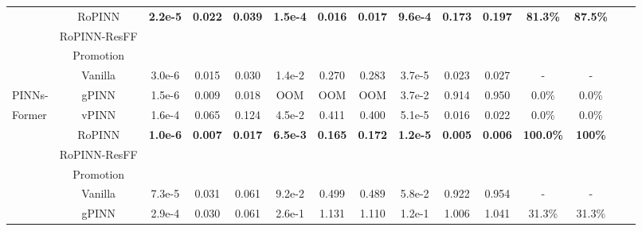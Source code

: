\begin{table}[t]
\begin{small}
\begin{tabular}{lcccccccccccccc}
                     & RoPINN & \cellcolor{tablelightblue}\textbf{2.2e-5} & \cellcolor{tablelightblue}\textbf{0.022} & \cellcolor{tablelightblue}\textbf{0.039} & \cellcolor{tablelightblue}\textbf{1.5e-4} & \cellcolor{tablelightblue}\textbf{0.016} & \cellcolor{tablelightblue}\textbf{0.017} & \cellcolor{tablelightblue}\textbf{9.6e-4} & \cellcolor{tablelightblue}\textbf{0.173} & \cellcolor{tablelightblue}\textbf{0.197} & \multirow{2}{*}{\textbf{81.3\%}} & \multirow{2}{*}{\textbf{87.5\%}}\\
                     \cmidrule(lr){2-13}
                     & RoPINN-ResFF &  &  &  &  &  &  &  &  &  &  &  \\
                     & Promotion &  &  &  &  &  &  &  &  &  &  & \\
                    \midrule
                     & Vanilla & 3.0e-6 & 0.015 & 0.030 & 1.4e-2 & 0.270 & 0.283 & 3.7e-5 & 0.023 & 0.027 & - & -\\
                     PINNs-& gPINN & \cellcolor{tablelightblue}1.5e-6 & \cellcolor{tablelightblue}0.009 & \cellcolor{tablelightblue}0.018 & OOM & OOM & OOM & 3.7e-2 & 0.914 & 0.950 & 0.0\% & 0.0\% \\
                     Former \cite{zhao2023pinnsformer} & vPINN & 1.6e-4 & 0.065 & 0.124 & 4.5e-2 & 0.411 & 0.400 & 5.1e-5 & \cellcolor{tablelightblue}0.016 & \cellcolor{tablelightblue}0.022 & 0.0\% & 0.0\%\\
                     & RoPINN & \cellcolor{tablelightblue}\textbf{1.0e-6} & \cellcolor{tablelightblue}\textbf{0.007} & \cellcolor{tablelightblue}\textbf{0.017} & \cellcolor{tablelightblue}\textbf{6.5e-3} & \cellcolor{tablelightblue}\textbf{0.165} & \cellcolor{tablelightblue}\textbf{0.172} & \cellcolor{tablelightblue}\textbf{1.2e-5} & \cellcolor{tablelightblue}\textbf{0.005} & \cellcolor{tablelightblue}\textbf{0.006} & \multirow{2}{*}{\textbf{100.0\%}} & \multirow{2}{*}{\textbf{100\%}} \\
                     \cmidrule(lr){2-13}
                     & RoPINN-ResFF &  &  &  &  &  &  &  &  &  &  &  \\
                     & Promotion &  &  &  &  &  &  &  &  &  &  & \\
                    \midrule
                    & Vanilla & 7.3e-5 & 0.031 & 0.061 & 9.2e-2 & 0.499 & 0.489 & 5.8e-2 & 0.922 & 0.954 & - & - \\
                     & gPINN & 2.9e-4 & \cellcolor{tablelightblue}0.030 & 0.061 & 2.6e-1 & 1.131 & 1.110 & 1.2e-1 & 1.006 & 1.041 & 31.3\% & 31.3\% \\

\end{tabular}
\end{small}
\end{table}
